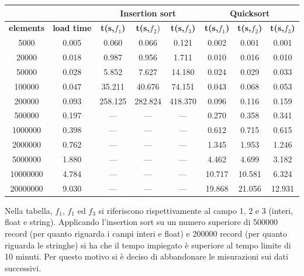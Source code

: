 \begin{table}[h]
\centering
\begin{tabular}{|c|c|c|c|c|c|c|c|}
\hline
         &           & \multicolumn{3}{c|}{\textbf{Insertion sort}} & \multicolumn{3}{c|}{\textbf{Quicksort}} \\ \hline
\textbf{elements}        & \textbf{load time} & \textbf{t(s,$f_1$)}      & \textbf{t(s,$f_2$})      & \textbf{t(s,$f_3$) }    & \textbf{t(s,$f_1$)}     & \textbf{t(s,$f_2$)}    & \textbf{t(s,$f_3$)}    \\ \hline
5000     & 0.005     & 0.060         & 0.066         & 0.121        & 0.002        & 0.001       & 0.001       \\ \hline
20000    & 0.018     & 0.987         & 0.956         & 1.711        & 0.010        & 0.016       & 0.010       \\ \hline
50000    & 0.028     & 5.852         & 7.627         & 14.180       & 0.024        & 0.029       & 0.033       \\ \hline
100000   & 0.047     & 35.211        & 40.676        & 74.151       & 0.043        & 0.068       & 0.053           \\ \hline
200000   & 0.093     & 258.125       & 282.824       & 418.370      & 0.096        & 0.116       & 0.159       \\ \hline
500000   & 0.197     & —             & —             & —            & 0.270        & 0.358       & 0.341       \\ \hline
1000000  & 0.398     & —             & —             & —            & 0.612        & 0.715       & 0.615       \\ \hline
2000000  & 0.762     & —             & —             & —            & 1.345        & 1.953       & 1.246       \\ \hline
5000000  & 1.880     & —             & —             & —            & 4.462        & 4.699       & 3.182       \\ \hline
10000000 & 4.784     & —             & —             & —            & 10.717        & 10.581       & 6.324       \\ \hline
20000000 & 9.030     & —             & —             & —            & 19.868       & 21.056      & 12.931      \\ \hline
\end{tabular}
\end{table}
\noindent
Nella tabella, $f_1$, $f_1$ ed $f_3$ si riferiscono rispettivamente al campo 1, 2 e 3 (interi, float e string).
\newline Applicando l'insertion sort su un numero superiore di 500000 record (per quanto riguarda i campi interi e float) e 200000 record (per quanto riguarda le stringhe) si ha che il tempo impiegato è superiore al tempo limite di 10 minuti. Per questo motivo si è deciso di abbandonare le misurazioni sui dati successivi.

